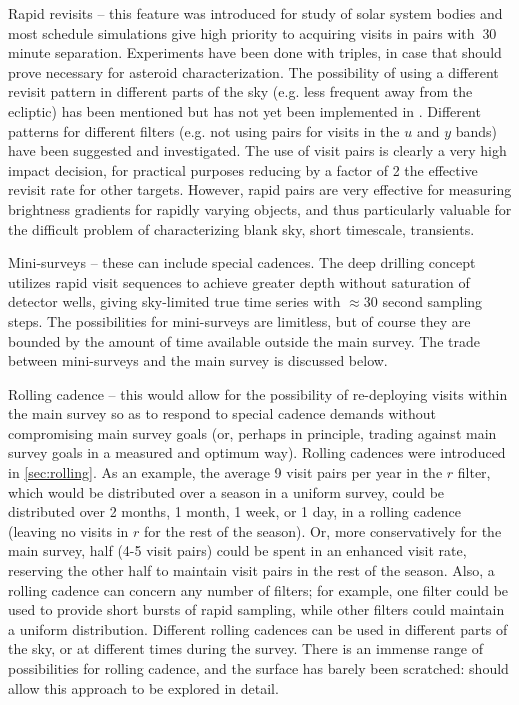 \begin{description}

\item{Rapid revisits} -- this feature was introduced for study of solar
system bodies and most schedule simulations give high priority to
acquiring visits in pairs with $~$30 minute separation.  Experiments
have been done with triples, in case that should prove necessary for
asteroid characterization.  The possibility of using a different revisit
pattern in different parts of the sky (e.g. less frequent away from the
ecliptic) has been mentioned but has not yet been implemented in \OpSim.  Different patterns for different filters
(e.g. not using pairs for visits in the $u$ and $y$ bands) have been
suggested and investigated. The use of visit pairs is clearly a very
high impact decision, for practical purposes reducing by a factor of 2
the effective revisit rate for other targets. However, rapid pairs are
very effective for measuring brightness gradients for rapidly varying
objects, and thus particularly valuable for the difficult problem of
characterizing blank sky, short timescale, transients.

\item{Mini-surveys} --  these can include special cadences. The deep
drilling concept utilizes rapid visit sequences to achieve greater depth
without saturation of detector wells, giving sky-limited true time
series with $\approx$30 second sampling steps.  The possibilities for
mini-surveys are limitless, but of course they are bounded by the amount
of time available outside the main survey. The trade between
mini-surveys and the main survey is discussed below.

\item{Rolling cadence} -- this would allow for the possibility of
re-deploying visits within the main survey so as to respond to special
cadence demands without compromising main survey goals (or, perhaps in
principle, trading against main survey goals in a measured and optimum
way). Rolling cadences were introduced in \autoref{sec:rolling}.  As an example, the
average 9 visit pairs per year in the $r$ filter, which would be
distributed over a season in a uniform survey, could be distributed over
2 months, 1 month, 1 week, or 1 day, in a rolling cadence (leaving no
visits in $r$ for the rest of the season).  Or, more conservatively for
the main survey, half (4-5 visit pairs) could be spent in an enhanced
visit rate, reserving the other half to maintain visit pairs in the rest
of the season.  Also, a rolling cadence can concern any number of
filters; for example, one filter could be used to provide short bursts
of rapid sampling, while other filters could maintain a uniform
distribution.  Different rolling cadences can be used in different parts
of the sky, or at different times during the survey.  There is an
immense range of possibilities for rolling cadence, and the surface has
barely been scratched:  should allow this approach to be explored in detail.


\end{description}
